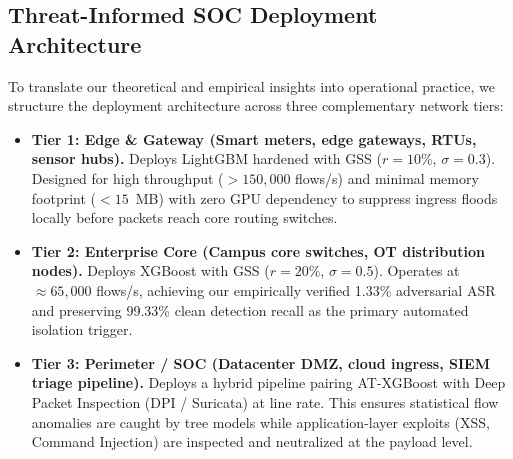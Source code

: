 \documentclass[iicol,pdflatex,sn-mathphys-num]{sn-jnl}
\begin{document}
\subsection{Threat-Informed SOC Deployment Architecture}
To translate our theoretical and empirical insights into operational practice, we structure the deployment architecture across three complementary network tiers:
\begin{itemize}
    \item \textbf{Tier 1: Edge \& Gateway (Smart meters, edge gateways, RTUs, sensor hubs).} Deploys LightGBM hardened with GSS ($r=10\%$, $\sigma=0.3$). Designed for high throughput ($>150,000$ flows/s) and minimal memory footprint ($<15$~MB) with zero GPU dependency to suppress ingress floods locally before packets reach core routing switches.
    \item \textbf{Tier 2: Enterprise Core (Campus core switches, OT distribution nodes).} Deploys XGBoost with GSS ($r=20\%$, $\sigma=0.5$). Operates at $\approx 65,000$ flows/s, achieving our empirically verified 1.33\% adversarial ASR and preserving 99.33\% clean detection recall as the primary automated isolation trigger.
    \item \textbf{Tier 3: Perimeter / SOC (Datacenter DMZ, cloud ingress, SIEM triage pipeline).} Deploys a hybrid pipeline pairing AT-XGBoost with Deep Packet Inspection (DPI / Suricata) at line rate. This ensures statistical flow anomalies are caught by tree models while application-layer exploits (XSS, Command Injection) are inspected and neutralized at the payload level.
\end{itemize}
\end{document}
